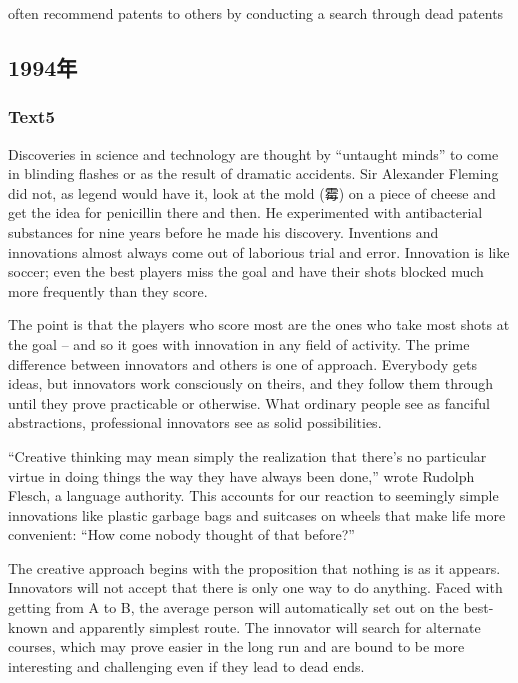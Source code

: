 \documentclass[a4paper]{article}
\begin{document}
often recommend patents to others by conducting a search through dead patents\\\subsection{1994年}
\subsubsection{Text5}

\par
Discoveries in science and technology are thought by “untaught minds” to come in blinding flashes or as the result of dramatic accidents. Sir Alexander Fleming did not, as legend would have it, look at the mold (霉) on a piece of cheese and get the idea for penicillin there and then. He experimented with antibacterial substances for nine years before he made his discovery. Inventions and innovations almost always come out of laborious trial and error. Innovation is like soccer; even the best players miss the goal and have their shots blocked much more frequently than they score.

\par
The point is that the players who score most are the ones who take most shots at the goal -- and so it goes with innovation in any field of activity. The prime difference between innovators and others is one of approach. Everybody gets ideas, but innovators work consciously on theirs, and they follow them through until they prove practicable or otherwise. What ordinary people see as fanciful abstractions, professional innovators see as solid possibilities.

\par
“Creative thinking may mean simply the realization that there’s no particular virtue in doing things the way they have always been done,” wrote Rudolph Flesch, a language authority. This accounts for our reaction to seemingly simple innovations like plastic garbage bags and suitcases on wheels that make life more convenient: “How come nobody thought of that before?”

\par
The creative approach begins with the proposition that nothing is as it appears. Innovators will not accept that there is only one way to do anything. Faced with getting from A to B, the average person will automatically set out on the best-known and apparently simplest route. The innovator will search for alternate courses, which may prove easier in the long run and are bound to be more interesting and challenging even if they lead to dead ends.
\end{document}
